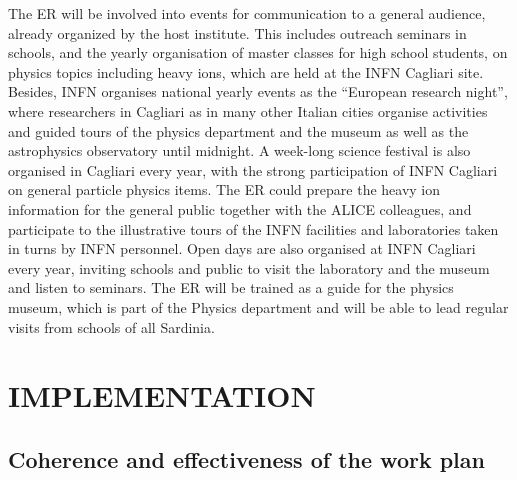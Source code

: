 \documentclass[a4paper,11pt]{article}
\newcommand{\ER}{ER\xspace}
\begin{document}
The \ER will be involved into events for communication to a general
audience, already organized by the host institute. This includes
outreach seminars in schools, and the yearly organisation of master
classes for high school students, on physics topics including heavy
ions, which are held at the INFN Cagliari site.  Besides, INFN organises 
national yearly events as the ``European research night'', where researchers
in Cagliari as in many other Italian cities organise activities and guided tours of the 
physics department and the museum as well as the 
astrophysics observatory until midnight.
A week-long science festival is also organised in Cagliari every year, 
with the strong participation of INFN Cagliari on general particle physics 
items. The \ER could prepare the heavy ion information for the general public together with the 
ALICE colleagues, and participate to the illustrative tours of the INFN
facilities and laboratories taken in turns 
by INFN personnel. 
Open days are also organised at INFN Cagliari every year, inviting schools and
public to visit the laboratory and the museum and listen to seminars.
The \ER will be trained as a guide for the physics museum, which 
is part of the Physics department and will be able to lead regular 
visits from schools of all Sardinia.
%        

\section{IMPLEMENTATION}
\label{sec:implementation}

%            
           
\subsection{Coherence and effectiveness of the work plan} \label{sec:WP}
\end{document}

